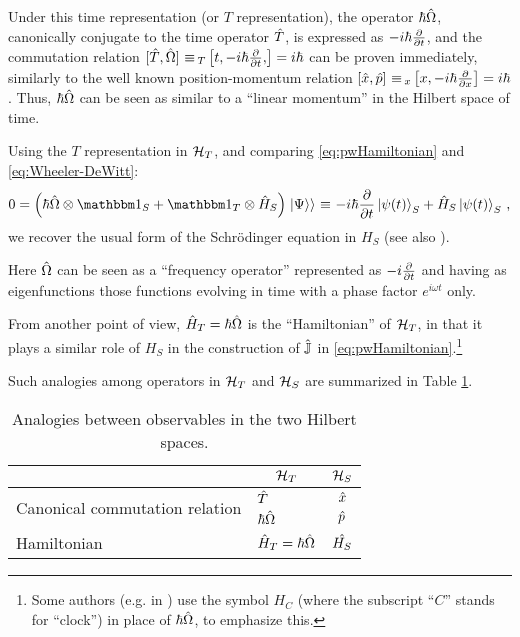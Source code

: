 Under this time representation (or $T$ representation), the operator $\hbar\hat{\Omega}$,
canonically conjugate to the time operator $\hat{T}$, is expressed as $-i\hbar\pdv{t}$,
and the commutation relation
$[\op{T}, \op{\Omega}] \repr_{T} \comm{t, -i\hbar\pdv{t}}{} = i\hbar$
can be proven
immediately, similarly to the well known position-momentum relation
$\comm{\op{x}}{\op{p}} \repr_{x} \comm{x}{-i\hbar\pdv{x}} = i\hbar$.
Thus, $\hbar\hat{\Omega}$ can be seen as similar to a ``linear momentum''
in the Hilbert space of time.


Using the $T$ representation in $\mathcal{H}_T$,
and comparing \eqref{eq:pwHamiltonian} and \eqref{eq:Wheeler-DeWitt}:
\begin{equation}\label{eq:schrod_from_pw}
  0 = \qty(\hbar\op{\Omega}\ox\idop_S + \idop_{T}\ox\op{H}_S)\dket{\Psi}
    \repr -i\hbar\pdv{t}\ket{\psi(t)}_{S} + \op{H}_S\ket{\psi(t)}_{S}
    \,\text{,}
\end{equation}
we recover the usual form of the Schr\"{o}dinger equation in $H_S$
(see also \cite[709--710]{Wootters:Loyola}).

Here $\hat{\Omega}$ can be seen as a ``frequency operator''
represented as $-i\pdv{t}$ and having as eigenfunctions
those functions evolving in time with a phase factor $e^{i \omega t}$ only.

From another point of view, $\hat{H}_{T} = \hbar\hat{\Omega}$ is the ``Hamiltonian'' of $\mathcal{H}_T$,
in that it plays a similar role of $H_S$ in the construction of
$\hat{\mathbb{J}}$ in \eqref{eq:pwHamiltonian}.\footnote{
  Some authors (e.g. in \citereset\cite{Wootters:Loyola})
  use the symbol $H_C$ (where the subscript ``$C$'' stands for ``clock'') in place of
  $\hbar\hat{\Omega}$, to emphasize this.
}

Such analogies among operators in $\mathcal{H}_T$ and $\mathcal{H}_S$ are summarized in Table \ref{tbl:op_comparison_pw}.

{
  \begin{table}
    \centering
    \begin{tabular}{l|l|c}
      & \multicolumn{1}{c|}{$\mathcal{H}_T$}   & \multicolumn{1}{|c}{$\mathcal{H}_S$}       \\
      \hline
      \multirow{2}{11em}{Canonical commutation relation} 
      & $\hat{T}$                                & $\hat{x}$                            \\
      & $\hbar\hat{\Omega}$                      & $\hat{p}$                            \\
      \hline
      Hamiltonian
      & $\hat{H}_T = \hbar\hat{\Omega}$           & $\hat{H_S}$
    \end{tabular}
    {\caption{
      Analogies between observables in the two Hilbert spaces.
    }\label{tbl:op_comparison_pw}}
  \end{table}
}

